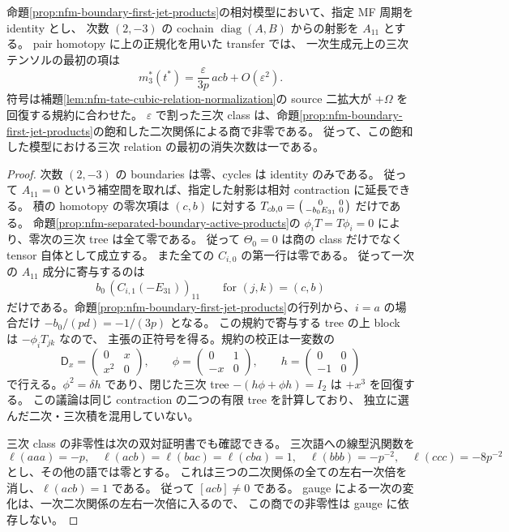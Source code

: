 \begin{proposition}
\label{prop:nfm-boundary-first-cubic-class}
命題\ref{prop:nfm-boundary-first-jet-products}の相対模型において、指定 MF 周期を identity とし、
次数 $(2,-3)$ の cochain $\operatorname{diag}(A,B)$ からの射影を $A_{11}$ とする。
pair homotopy に上の正規化を用いた transfer では、
一次生成元上の三次テンソルの最初の項は
\[
 m_3^*(t^*)=\frac{\varepsilon}{3p}\,acb+O(\varepsilon^2).
\]
符号は補題\ref{lem:nfm-tate-cubic-relation-normalization}の
source 二拡大が $+\Omega$ を回復する規約に合わせた。
$\varepsilon$ で割った三次 class は、命題\ref{prop:nfm-boundary-first-jet-products}の飽和した二次関係による商で非零である。
従って、この飽和した模型における三次 relation の最初の消失次数は一である。
\end{proposition}
\begin{proof}
次数 $(2,-3)$ の boundaries は零、cycles は identity のみである。
従って $A_{11}=0$ という補空間を取れば、指定した射影は相対 contraction に延長できる。
積の homotopy の零次項は $(c,b)$ に対する
$T_{cb,0}=\begin{psmallmatrix}0&0\\-b_0E_{31}&0\end{psmallmatrix}$ だけである。
命題\ref{prop:nfm-separated-boundary-active-products}の
$\phi_iT=T\phi_i=0$ により、零次の三次 tree は全て零である。
従って $\Theta_0=0$ は商の class だけでなく tensor 自体として成立する。
また全ての $C_{i,0}$ の第一行は零である。
従って一次の $A_{11}$ 成分に寄与するのは
\[
 b_0\,(C_{i,1}(-E_{31}))_{11}
 \qquad\text{for }(j,k)=(c,b)
\]
だけである。命題\ref{prop:nfm-boundary-first-jet-products}の行列から、$i=a$ の場合だけ
$-b_0/(pd)=-1/(3p)$ となる。
この規約で寄与する tree の上 block は $-\phi_iT_{jk}$ なので、
主張の正符号を得る。規約の校正は一変数の
\[
 \mathsf D_x=\begin{pmatrix}0&x\\x^2&0\end{pmatrix},\qquad
 \phi=\begin{pmatrix}0&1\\-x&0\end{pmatrix},\qquad
 h=\begin{pmatrix}0&0\\-1&0\end{pmatrix}
\]
で行える。$\phi^2=\delta h$ であり、閉じた三次 tree
$-(h\phi+\phi h)=I_2$ は $+x^3$ を回復する。
この議論は同じ contraction の二つの有限 tree を計算しており、
独立に選んだ二次・三次積を混用していない。

三次 class の非零性は次の双対証明書でも確認できる。
三次語への線型汎関数を
\[
 \ell(aaa)=-p,\quad
 \ell(acb)=\ell(bac)=\ell(cba)=1,\quad
 \ell(bbb)=-p^{-2},\quad\ell(ccc)=-8p^{-2}
\]
とし、その他の語では零とする。
これは三つの二次関係の全ての左右一次倍を消し、$\ell(acb)=1$ である。
従って $[acb]\ne0$ である。
gauge による一次の変化は、一次二次関係の左右一次倍に入るので、
この商での非零性は gauge に依存しない。
\end{proof}

